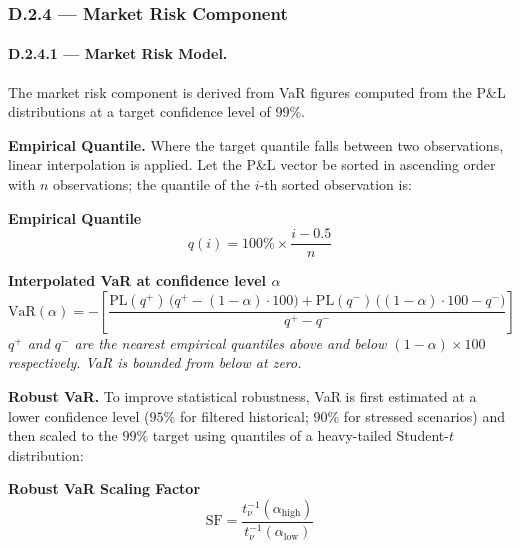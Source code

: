 \documentclass[9pt, a4paper]{extarticle}
\newenvironment{formulabox}{\par\addvspace{4pt}}{\par\addvspace{4pt}}
\begin{document}
\newpage

\subsubsection{D.2.4 — Market Risk Component}

\paragraph{D.2.4.1 — Market Risk Model.}

The market risk component is derived from VaR figures computed from the P\&L
distributions at a target confidence level of $99\%$.

\medskip
\textbf{Empirical Quantile.}
Where the target quantile falls between two observations, linear interpolation
is applied. Let the P\&L vector be sorted in ascending order with $n$
observations; the quantile of the $i$-th sorted observation is:

\begin{formulabox}
\textbf{Empirical Quantile}
\begin{equation*}
    q(i) = 100\% \times \frac{i - 0.5}{n}
\end{equation*}
\end{formulabox}

\begin{formulabox}
\textbf{Interpolated VaR at confidence level $\alpha$}
\begin{equation*}
    \mathrm{VaR}(\alpha) = -\left[
        \frac{\mathrm{PL}(q^{+})\,\bigl(q^{+} - (1-\alpha)\cdot100\bigr)
            + \mathrm{PL}(q^{-})\,\bigl((1-\alpha)\cdot100 - q^{-}\bigr)}
             {q^{+} - q^{-}}
    \right]
\end{equation*}
\textit{$q^{+}$ and $q^{-}$ are the nearest empirical quantiles above and below
$(1-\alpha)\times100$ respectively. VaR is bounded from below at zero.}
\end{formulabox}

\medskip
\textbf{Robust VaR.}
To improve statistical robustness, VaR is first estimated at a lower
confidence level ($95\%$ for filtered historical; $90\%$ for stressed scenarios)
and then scaled to the $99\%$ target using quantiles of a heavy-tailed
Student-$t$ distribution:

\begin{formulabox}
\textbf{Robust VaR Scaling Factor}
\begin{equation*}
    \mathrm{SF} =
        \frac{t_{\nu}^{-1}(\alpha_{\mathrm{high}})}
             {t_{\nu}^{-1}(\alpha_{\mathrm{low}})}
\end{equation*}
\end{formulabox}
\end{document}
